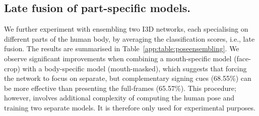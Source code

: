 \begin{table}[h!]
    \centering
    \caption{Ensembling part-specific models from 
        Table~\ref{table:pose2sign}.
We observe that combining the I3D model trained only with the face
        and another model without the mouth (last row) achieves
        superior performance than using one model that inputs the
        full-frame. This suggests that disentangling manual and non-manual
        features, which are complementary, for sign recognition is a promising direction.
        The models are trained on
        the subset of \datasetName{} where pose estimates are available.
    }
    \label{app:table:poseensembling}
\end{table}


\subsection{Late fusion of part-specific models.} \label{app:subsec:fusion}
We further experiment with ensembling two I3D networks,
each specialising on different parts of the human body,
by averaging the classification scores, i.e., late fusion.
The results are summarised in Table~\ref{app:table:poseensembling}.
We observe significant improvements
when combining a mouth-specific model (face-crop)
with a body-specific model (mouth-masked),
which suggests that forcing the network to
focus on separate, but complementary signing cues (68.55\%)
can be more effective than presenting the full-frames (65.57\%).
This procedure; however, involves additional complexity
of computing the human pose and training two separate models.
It is therefore only used for experimental purposes.

